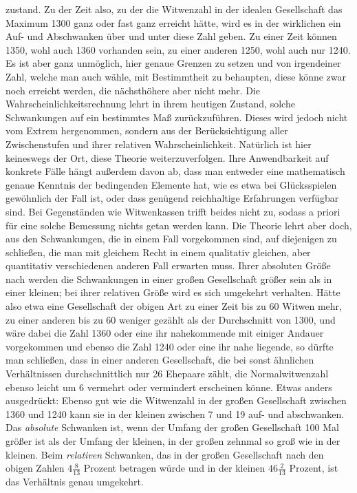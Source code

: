 zustand. Zu der Zeit also, zu der die Witwenzahl in der idealen Gesellschaft das Maximum 1300 ganz oder fast ganz erreicht hätte, wird es in der wirklichen ein Auf- und Abschwanken über und unter diese Zahl geben. Zu einer Zeit können 1350, wohl auch 1360 vorhanden sein, zu einer anderen 1250, wohl auch nur 1240. Es ist aber ganz unmöglich, hier genaue Grenzen zu setzen und von irgendeiner Zahl, welche man auch wähle, mit Bestimmtheit zu behaupten, diese könne zwar noch erreicht werden, die nächsthöhere aber nicht mehr. Die Wahrscheinlichkeitsrechnung lehrt in ihrem heutigen Zustand, solche Schwankungen auf ein bestimmtes Maß zurückzuführen. Dieses wird jedoch nicht vom Extrem hergenommen, sondern aus der Berücksichtigung aller Zwischenstufen und ihrer relativen Wahrscheinlichkeit. Natürlich ist hier keineswegs der Ort, diese Theorie weiterzuverfolgen. Ihre Anwendbarkeit auf konkrete Fälle hängt außerdem davon ab, dass man entweder eine mathematisch genaue Kenntnis der bedingenden Elemente hat, wie es etwa bei Glücksspielen gewöhnlich der Fall ist, oder dass genügend reichhaltige Erfahrungen verfügbar sind. Bei Gegenständen wie Witwenkassen trifft beides nicht zu, sodass a priori für eine solche Bemessung nichts getan werden kann. Die Theorie lehrt aber doch, aus den Schwankungen, die in einem Fall vorgekommen sind, auf diejenigen zu schließen, die man mit gleichem Recht in einem qualitativ gleichen, aber quantitativ verschiedenen anderen Fall erwarten muss. Ihrer absoluten Größe nach werden die Schwankungen in einer großen Gesellschaft größer sein als in einer kleinen; bei ihrer relativen Größe wird es sich umgekehrt verhalten. Hätte also etwa eine Gesellschaft der obigen Art zu einer Zeit bis zu 60 Witwen mehr, zu einer anderen bis zu 60 weniger gezählt als der Durchschnitt von 1300, und wäre dabei die Zahl 1360 oder eine ihr nahekommende mit einiger Andauer vorgekommen und ebenso die Zahl 1240 oder eine ihr nahe liegende, so dürfte man schließen, dass in einer anderen Gesellschaft, die bei sonst ähnlichen Verhältnissen durchschnittlich nur 26 Ehepaare zählt, die Normalwitwenzahl ebenso leicht um 6 vermehrt oder vermindert erscheinen könne. Etwas anders ausgedrückt: Ebenso gut wie die Witwenzahl in der großen Gesellschaft zwischen 1360 und 1240 kann sie in der kleinen zwischen 7 und 19 auf- und abschwanken. Das \textit{absolute} Schwanken ist, wenn der Umfang der großen Gesellschaft 100 Mal größer ist als der Umfang der kleinen, in der großen zehnmal so groß wie in der kleinen. Beim \textit{relativen} Schwanken, das in der großen Gesellschaft nach den obigen Zahlen \(4\tfrac8{13}\) Prozent betragen würde und in der kleinen \(46\tfrac2{13}\) Prozent, ist das Verhältnis genau umgekehrt.

